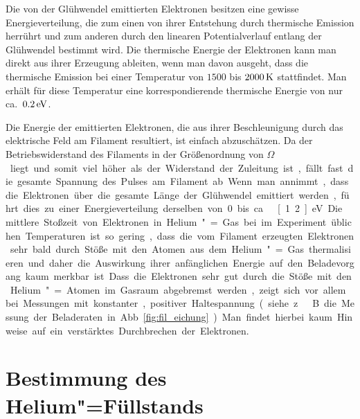 Die von der Glühwendel emittierten Elektronen besitzen eine gewisse Energieverteilung, die zum einen von ihrer Entstehung durch thermische Emission herrührt und zum anderen durch den linearen Potentialverlauf entlang der Glühwendel bestimmt wird. Die thermische Energie der Elektronen kann man direkt aus ihrer Erzeugung ableiten, wenn man davon ausgeht, dass die thermische Emission bei einer Temperatur von $1500$ bis $\unit[2000]{K}$ stattfindet. Man erhält für diese Temperatur eine korrespondierende thermische Energie von nur ca.\ $\unit[0.2]{eV}$.

Die Energie der emittierten Elektronen, die aus ihrer Beschleunigung durch das elektrische Feld am Filament resultiert, ist einfach abzuschätzen. Da der Betriebswiderstand des Filaments in der Größenordnung von \unit[100]{$\Omega$} liegt und somit viel höher als der Widerstand der Zuleitung ist, fällt fast die gesamte Spannung des Pulses am Filament ab. Wenn man annimmt, dass die Elektronen über die gesamte Länge der Glühwendel emittiert werden, führt dies zu einer Energieverteilung derselben von 0 bis ca.\ \unit[1.2]{eV}.

Die mittlere Stoßzeit von Elektronen in Helium"=Gas bei im Experiment üblichen Temperaturen ist so gering, dass die vom Filament erzeugten Elektronen sehr bald durch Stöße mit den Atomen aus dem Helium"=Gas thermalisieren und daher die Auswirkung ihrer anfänglichen Energie auf den Beladevorgang kaum merkbar ist. Dass die Elektronen sehr gut durch die Stöße mit den Helium"=Atomen im Gasraum abgebremst werden, zeigt sich vor allem bei Messungen mit konstanter, positiver Haltespannung (siehe z.\ B. die Messung der Beladeraten in Abb.~\ref{fig:fil_eichung}). Man findet hierbei kaum Hinweise auf ein verstärktes Durchbrechen der Elektronen. 

\section{Bestimmung des Helium"=Füllstands}

